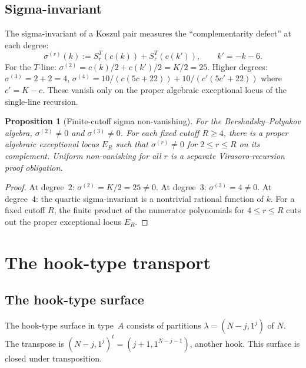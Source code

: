 \documentclass[11pt]{article}
\theoremstyle{plain}
\newtheorem{proposition}[theorem]{Proposition}
\theoremstyle{definition}
\theoremstyle{remark}
\numberwithin{equation}{section}
\begin{document}
\subsection{Sigma-invariant}

The sigma-invariant of a Koszul pair measures the ``complementarity
defect'' at each degree:
\begin{equation}\label{eq:sigma-invariant}
 \sigma^{(r)}(k) := S_r^T(c(k)) + S_r^T(c(k')),
 \qquad k' = -k-6.
\end{equation}
For the $T$-line: $\sigma^{(2)} = c(k)/2 + c(k')/2 = K/2 = 25$.
Higher degrees: $\sigma^{(3)} = 2 + 2 = 4$,
$\sigma^{(4)} = 10/(c(5c+22)) + 10/(c'(5c'+22))$ where
$c' = K - c$. These vanish only on the proper algebraic exceptional
locus of the single-line recursion.

\begin{proposition}[Finite-cutoff sigma non-vanishing]
\label{prop:sigma-nonvanishing}
For the Bershadsky--Polyakov algebra, $\sigma^{(2)}\ne0$ and
$\sigma^{(3)}\ne0$. For each fixed cutoff $R\ge4$, there is a
proper algebraic exceptional locus $E_R$ such that
$\sigma^{(r)}\ne0$ for $2\le r\le R$ on its complement. Uniform
non-vanishing for all $r$ is a separate Virasoro-recursion proof
obligation.
\end{proposition}

\begin{proof}
At degree~$2$: $\sigma^{(2)} = K/2 = 25 \neq 0$. At degree~$3$:
$\sigma^{(3)} = 4 \neq 0$. At degree~$4$: the quartic sigma-invariant
is a nontrivial rational function of $k$. For a fixed cutoff $R$, the
finite product of the numerator polynomials for
$4\le r\le R$ cuts out the proper exceptional locus $E_R$.
\end{proof}

\section{The hook-type transport}\label{sec:hook}

\subsection{The hook-type surface}

The hook-type surface in type~$A$ consists of partitions
$\lambda = (N-j, 1^j)$ of $N$. The transpose is
$(N-j, 1^j)^t = (j+1, 1^{N-j-1})$, another hook. This surface is
closed under transposition.
\end{document}
